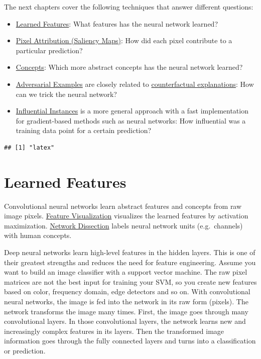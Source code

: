 \documentclass[
  11pt,
]{scrbook}
\providecommand{\tightlist}{%
  \setlength{\itemsep}{0pt}\setlength{\parskip}{0pt}}
\begin{document}
The next chapters cover the following techniques that answer different questions:

\begin{itemize}
\tightlist
\item
  \protect\hyperlink{feature-visualization}{Learned Features}: What features has the neural network learned?
\item
  \protect\hyperlink{pixel-attribution}{Pixel Attribution (Saliency Maps)}: How did each pixel contribute to a particular prediction?
\item
  \protect\hyperlink{neural-concepts}{Concepts}: Which more abstract concepts has the neural network learned?
\item
  \protect\hyperlink{adversarial}{Adversarial Examples} are closely related to \protect\hyperlink{counterfactual}{counterfactual explanations}: How can we trick the neural network?
\item
  \protect\hyperlink{influential}{Influential Instances} is a more general approach with a fast implementation for gradient-based methods such as neural networks: How influential was a training data point for a certain prediction?
\end{itemize}

\begin{verbatim}
## [1] "latex"
\end{verbatim}

\newpage

\hypertarget{cnn-features}{%
\section{Learned Features}\label{cnn-features}}

Convolutional neural networks learn abstract features and concepts from raw image pixels.
\protect\hyperlink{feature-visualization}{Feature Visualization} visualizes the learned features by activation maximization.
\protect\hyperlink{network-dissection}{Network Dissection} labels neural network units (e.g.~channels) with human concepts.

Deep neural networks learn high-level features in the hidden layers.
This is one of their greatest strengths and reduces the need for feature engineering.
Assume you want to build an image classifier with a support vector machine.
The raw pixel matrices are not the best input for training your SVM, so you create new features based on color, frequency domain, edge detectors and so on.
With convolutional neural networks, the image is fed into the network in its raw form (pixels).
The network transforms the image many times.
First, the image goes through many convolutional layers.
In those convolutional layers, the network learns new and increasingly complex features in its layers.
Then the transformed image information goes through the fully connected layers and turns into a classification or prediction.
\end{document}
